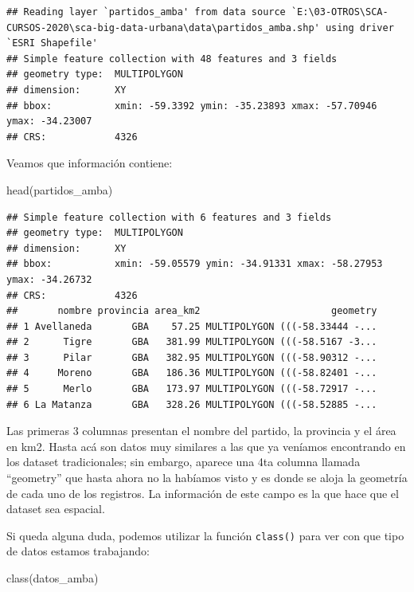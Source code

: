 \documentclass[
  spanish,
]{book}
\newenvironment{Shaded}{\begin{snugshade}}{\end{snugshade}}
\newcommand{\FunctionTok}[1]{\textcolor[rgb]{0.00,0.00,0.00}{#1}}
\newcommand{\NormalTok}[1]{#1}
\begin{document}
\begin{verbatim}
## Reading layer `partidos_amba' from data source `E:\03-OTROS\SCA-CURSOS-2020\sca-big-data-urbana\data\partidos_amba.shp' using driver `ESRI Shapefile'
## Simple feature collection with 48 features and 3 fields
## geometry type:  MULTIPOLYGON
## dimension:      XY
## bbox:           xmin: -59.3392 ymin: -35.23893 xmax: -57.70946 ymax: -34.23007
## CRS:            4326
\end{verbatim}

Veamos que información contiene:

\begin{Shaded}
\begin{Highlighting}[]
\FunctionTok{head}\NormalTok{(partidos\_amba)}
\end{Highlighting}
\end{Shaded}

\begin{verbatim}
## Simple feature collection with 6 features and 3 fields
## geometry type:  MULTIPOLYGON
## dimension:      XY
## bbox:           xmin: -59.05579 ymin: -34.91331 xmax: -58.27953 ymax: -34.26732
## CRS:            4326
##       nombre provincia area_km2                       geometry
## 1 Avellaneda       GBA    57.25 MULTIPOLYGON (((-58.33444 -...
## 2      Tigre       GBA   381.99 MULTIPOLYGON (((-58.5167 -3...
## 3      Pilar       GBA   382.95 MULTIPOLYGON (((-58.90312 -...
## 4     Moreno       GBA   186.36 MULTIPOLYGON (((-58.82401 -...
## 5      Merlo       GBA   173.97 MULTIPOLYGON (((-58.72917 -...
## 6 La Matanza       GBA   328.26 MULTIPOLYGON (((-58.52885 -...
\end{verbatim}

Las primeras 3 columnas presentan el nombre del partido, la provincia y el área en km2. Hasta acá son datos muy similares a las que ya veníamos encontrando en los dataset tradicionales; sin embargo, aparece una 4ta columna llamada ``geometry'' que hasta ahora no la habíamos visto y es donde se aloja la geometría de cada uno de los registros. La información de este campo es la que hace que el dataset sea espacial.

Si queda alguna duda, podemos utilizar la función \texttt{class()} para ver con que tipo de datos estamos trabajando:

\begin{Shaded}
\begin{Highlighting}[]
\FunctionTok{class}\NormalTok{(datos\_amba)}
\end{Highlighting}
\end{Shaded}
\end{document}
